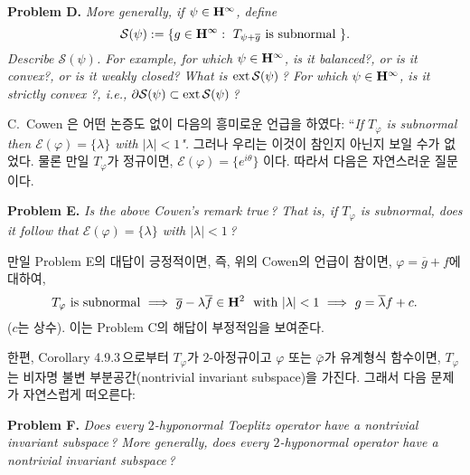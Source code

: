 \documentclass[12pt,a4paper,2sided]{article}
\begin{document}
\vspace{.2 cm}

{\bf Problem D.} {\sl More generally, if $\psi
\in\bold{H}^\infty$, define
$$
\mathcal{S}(\psi):=\{g\in\bold{H}^\infty:\ T_{\psi+\overline g}\ \mbox{is subnormal}\ \}.
$$
Describe $\mathcal{S}(\psi)$. For example, for which $\psi\in \bold{H}^\infty$, is it balanced?, or is it convex?, or is it weakly closed?
What is ${\rm ext}\,\mathcal{S}(\psi)$\,?
For which $\psi\in \bold{H}^\infty$, is it strictly convex ?, i.e.,
$\partial\mathcal{S}(\psi)\subset{\rm ext}\,\mathcal{S}(\psi)$\,?
}

\vspace{.2 cm} C.\ Cowen \cite{Cow3}은 어떤 논증도 없이 다음의
흥미로운 언급을 하였다: ``{\it If $T_\varphi$ is subnormal then
$\mathcal{E}(\varphi)=\{\lambda\}$ with $|\lambda|<1$".} 그러나
우리는 이것이 참인지 아닌지 보일 수가 없었다. 물론 만일
$T_\varphi$가 정규이면, $\mathcal{E}(\varphi)=\{e^{i\theta}\}$ 이다.
따라서 다음은 자연스러운 질문이다.

\vspace{.2 cm} {\bf Problem E.} {\sl Is the above Cowen's remark
true\,? That is, if $T_\varphi$ is subnormal, does it follow that
$\mathcal{E}(\varphi)=\{\lambda\}$ with $|\lambda|<1$\,? }

\vspace{.2 cm}

만일 Problem E의 대답이 긍정적이면, 즉,
위의 Cowen의 언급이 참이면, $\varphi=\overline g+f$에 대하여,
$$
\mbox{$T_\varphi$ is subnormal}\ \Longrightarrow \ \overline
g-\lambda \overline f\in \bold{H}^2\ \ \mbox{with}\ |\lambda|<1\
\Longrightarrow\ g=\overline\lambda f+c.
$$
($c$는 상수). 이는 Problem C의 해답이 부정적임을 보여준다.

\vspace{.2 cm}

한편, Corollary 4.9.3\,으로부터 $T_\varphi$가 $2$-아정규이고
$\varphi$ 또는 $\bar\varphi$가 유계형식 함수이면, $T_\varphi$는
비자명 불변 부분공간(nontrivial invariant subspace)을 가진다. 그래서
다음 문제가 자연스럽게 떠오른다: \vspace{.2 cm}

 {\bf Problem F.} {\sl Does every $2$-hyponormal
Toeplitz operator have a nontrivial invariant subspace\,? More
generally, does every $2$-hyponormal operator have a nontrivial
invariant subspace\,? }

\vspace{.2 cm}


\newpage{} \vspace{0.8cm}
\end{document}
